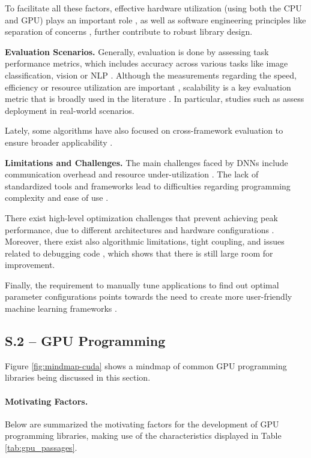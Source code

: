 To facilitate all these factors, effective hardware utilization (using both the CPU and GPU) plays
an important role , as well as software engineering principles like separation of
concerns , further contribute to robust library design.

\textbf{Evaluation Scenarios.}
Generally, evaluation is done by assessing task performance metrics, which includes accuracy
across various tasks like image classification, vision or NLP .
Although the measurements regarding the speed, efficiency or resource utilization are important
, scalability is a key evaluation metric that is broadly used in the
literature . In particular, studies such as  assess
deployment in real-world scenarios.

Lately, some algorithms have also focused on cross-framework evaluation to ensure broader
applicability .

\textbf{Limitations and Challenges.}
The main challenges faced by DNNs include communication overhead and resource under-utilization
. The lack of standardized tools and frameworks lead
to difficulties regarding programming complexity and ease of use .

There exist high-level optimization challenges that prevent achieving peak performance, due to
different architectures and hardware configurations . Moreover, there exist
also algorithmic limitations, tight coupling, and issues related to debugging code
, which shows that there is still large room for improvement.

Finally, the requirement to manually tune applications to find out optimal parameter configurations
points towards the need to create more user-friendly machine learning frameworks .

\subsection{S.2 -- GPU Programming}
\label{sec:gpu-studies}
Figure \ref{fig:mindmap-cuda} shows a mindmap of common GPU programming libraries being discussed
in this section.

\paragraph{Motivating Factors.}
Below are summarized the motivating factors for the development of GPU programming libraries,
making use of the characteristics displayed in Table \ref{tab:gpu_passages}.

